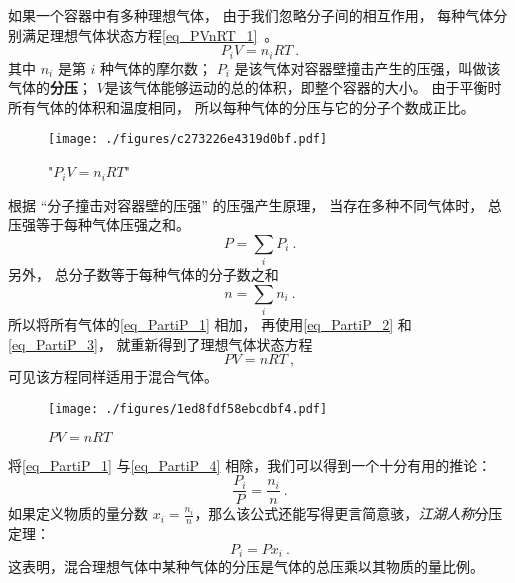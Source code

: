 

如果一个容器中有多种理想气体， 由于我们忽略分子间的相互作用， 每种气体分别满足理想气体状态方程\autoref{eq_PVnRT_1}~。
\begin{equation}\label{eq_PartiP_1}
P_i V = n_i R T~.
\end{equation}
其中 $n_i$ 是第 $i$ 种气体的摩尔数； $P_i$ 是该气体对容器壁撞击产生的压强，叫做该气体的\textbf{分压}； $V$是该气体能够运动的总的体积，即整个容器的大小。 由于平衡时所有气体的体积和温度相同， 所以每种气体的分压与它的分子个数成正比。
\begin{figure}[ht]
\centering
\texttt{[image: ./figures/c273226e4319d0bf.pdf]}
\caption{"$P_i V = n_i R T$"} \label{fig_PartiP_4}
\end{figure}

根据 “分子撞击对容器壁的压强” 的压强产生原理， 当存在多种不同气体时， 总压强等于每种气体压强之和。
\begin{equation}\label{eq_PartiP_2}
P = \sum_i P_i~.
\end{equation}
另外， 总分子数等于每种气体的分子数之和
\begin{equation}\label{eq_PartiP_3}
n = \sum_i n_i~.
\end{equation}
所以将所有气体的\autoref{eq_PartiP_1} 相加， 再使用\autoref{eq_PartiP_2} 和\autoref{eq_PartiP_3}， 就重新得到了理想气体状态方程
\begin{equation}\label{eq_PartiP_4}
P V = n RT~,
\end{equation}
可见该方程同样适用于混合气体。

\begin{figure}[ht]
\centering
\texttt{[image: ./figures/1ed8fdf58ebcdbf4.pdf]}
\caption{$P V = n RT$} \label{fig_PartiP_3}
\end{figure}

将\autoref{eq_PartiP_1} 与\autoref{eq_PartiP_4}  相除，我们可以得到一个十分有用的推论：
\begin{equation}
\frac{P_i}{P} = \frac{n_i}{n} ~.
\end{equation}
如果定义物质的量分数 $x_i = \frac{n_i}{n}$，那么该公式还能写得更言简意骇，\textsl{江湖人称}分压定理：
\begin{equation}
P_i = P x_i ~.
\end{equation}
这表明，混合理想气体中某种气体的分压是气体的总压乘以其物质的量比例。
